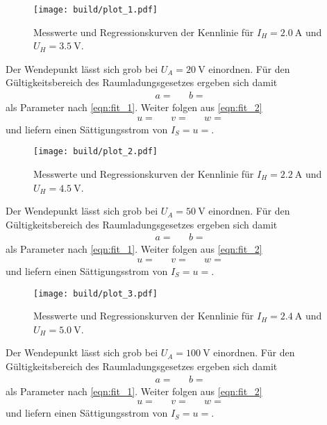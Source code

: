 \begin{figure}[H]
	\texttt{[image: build/plot\_1.pdf]}
	\caption{Messwerte und Regressionskurven der Kennlinie für $I_H = \qty{2.0}{\ampere}$ und $U_H = \qty{3.5}{\volt}$.}
	\label{fig:plot_1}
\end{figure}

Der Wendepunkt lässt sich grob bei $U_A = \qty{20}{\volt}$ einordnen. Für den Gültigkeitsbereich des Raumladungsgesetzes
ergeben sich damit
\begin{align*}
	a =  && b = 
\end{align*}
als Parameter nach \eqref{eqn:fit_1}. Weiter folgen aus \eqref{eqn:fit_2}
\begin{align*}
	u =  && v =  && w = 
\end{align*}
und liefern einen Sättigungsstrom von $I_S = u = $. 

\begin{figure}[H]
	\texttt{[image: build/plot\_2.pdf]}
	\caption{Messwerte und Regressionskurven der Kennlinie für $I_H = \qty{2.2}{\ampere}$ und $U_H = \qty{4.5}{\volt}$.}
	\label{fig:plot_2}
\end{figure}

Der Wendepunkt lässt sich grob bei $U_A = \qty{50}{\volt}$ einordnen. Für den Gültigkeitsbereich des Raumladungsgesetzes
ergeben sich damit
\begin{align*}
	a =  && b = 
\end{align*}
als Parameter nach \eqref{eqn:fit_1}. Weiter folgen aus \eqref{eqn:fit_2}
\begin{align*}
	u =  && v =  && w = 
\end{align*}
und liefern einen Sättigungsstrom von $I_S = u = $. 

\begin{figure}[H]
	\texttt{[image: build/plot\_3.pdf]}
	\caption{Messwerte und Regressionskurven der Kennlinie für $I_H = \qty{2.4}{\ampere}$ und $U_H = \qty{5.0}{\volt}$.}
	\label{fig:plot_3}
\end{figure}

Der Wendepunkt lässt sich grob bei $U_A = \qty{100}{\volt}$ einordnen. Für den Gültigkeitsbereich des Raumladungsgesetzes
ergeben sich damit
\begin{align*}
	a =  && b = 
\end{align*}
als Parameter nach \eqref{eqn:fit_1}. Weiter folgen aus \eqref{eqn:fit_2}
\begin{align*}
	u =  && v =  && w = 
\end{align*}
und liefern einen Sättigungsstrom von $I_S = u = $. 

